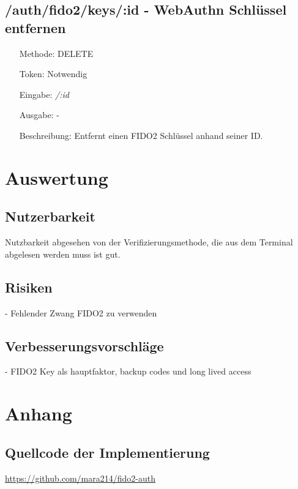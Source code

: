 \documentclass[journal]{IEEEtran}
\begin{document}
\subsection{/auth/fido2/keys/:id - WebAuthn Schlüssel entfernen}

\begin{itemize}
	\setlength{\leftskip}{1.5cm}
	\setlength{\itemsep}{0pt}
	\item[Methode:] DELETE
	\item[Token:] Notwendig
	\item[Eingabe:] \textit{/:id}
	\item[Ausgabe:] -
	\item[Beschreibung:] Entfernt einen FIDO2 Schlüssel anhand seiner ID.\@
\end{itemize}

\section{Auswertung}

\subsection{Nutzerbarkeit}

Nutzbarkeit abgesehen von der Verifizierungsmethode, die aus dem Terminal
abgelesen werden muss ist gut.

\subsection{Risiken}

- Fehlender Zwang FIDO2 zu verwenden

\subsection{Verbesserungsvorschläge}

- FIDO2 Key als hauptfaktor, backup codes und long lived access

\listoffigures




\section*{Anhang}

\subsection*{Quellcode der Implementierung}

\url{https://github.com/mara214/fido2-auth}
\end{document}
